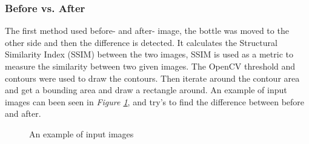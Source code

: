 \subsubsection*{Before vs. After}\label{beforeandafter}
The first method used before- and after- image, the bottle was moved to the other side and then the difference is detected. It calculates the Structural Similarity Index (SSIM) between the two images, SSIM \cite{datta_all_2020} is used as a metric to measure the similarity between two given images. The OpenCV threshold and contours were used to draw the contours. Then iterate around the contour area and get a bounding area and draw a rectangle around.
An example of input images can been seen in \textit{Figure \ref{figure: beforeafter}}, and try's to find the difference between before and after.
\begin{figure}[h]
 \centering
 \hfill
 \caption{An example of input images}
 \label{figure: beforeafter}
\end{figure}

